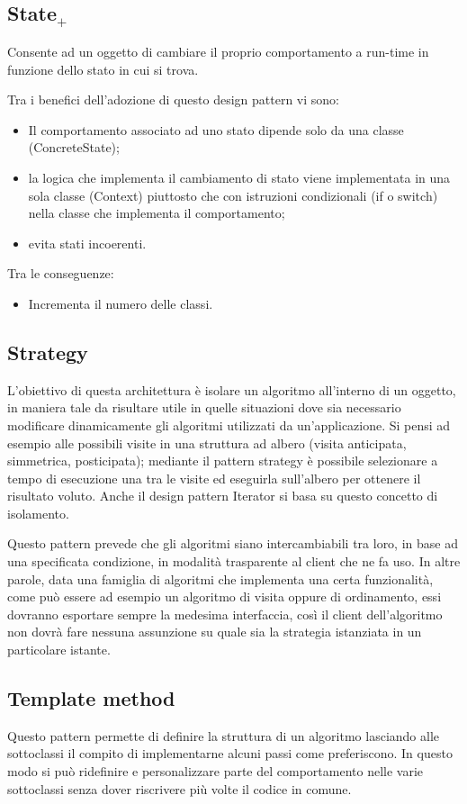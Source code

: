 \subsection{State$_+$}
Consente ad un oggetto di cambiare il proprio comportamento a run-time in funzione dello stato in cui si trova.

Tra i benefici dell'adozione di questo design pattern vi sono:
\begin{itemize}
	\item Il comportamento associato ad uno stato dipende solo da una classe (ConcreteState);
	\item la logica che implementa il cambiamento di stato viene implementata in una sola classe (Context) piuttosto che con istruzioni condizionali (if o switch) nella classe che implementa il comportamento;
	\item evita stati incoerenti.
\end{itemize}
Tra le conseguenze:
\begin{itemize}
\item Incrementa il numero delle classi.
\end{itemize}

\subsection{Strategy}
L'obiettivo di questa architettura è isolare un algoritmo all'interno di un oggetto, in maniera tale da risultare utile in quelle situazioni dove sia necessario modificare dinamicamente gli algoritmi utilizzati da un'applicazione. 
Si pensi ad esempio alle possibili visite in una struttura ad albero (visita anticipata, simmetrica, posticipata); mediante il pattern strategy è possibile selezionare a tempo di esecuzione una tra le visite ed eseguirla sull'albero per ottenere il risultato voluto.
Anche il design pattern Iterator si basa su questo concetto di isolamento.

Questo pattern prevede che gli algoritmi siano intercambiabili tra loro, in base ad una specificata condizione, in modalità trasparente al client che ne fa uso. In altre parole, data una famiglia di algoritmi che implementa una certa funzionalità, come può essere ad esempio un algoritmo di visita oppure di ordinamento, essi dovranno esportare sempre la medesima interfaccia, così il client dell'algoritmo non dovrà fare nessuna assunzione su quale sia la strategia istanziata in un particolare istante.

\subsection{Template method}
Questo pattern permette di definire la struttura di un algoritmo lasciando alle sottoclassi il compito di implementarne alcuni passi come preferiscono. In questo modo si può ridefinire e personalizzare parte del comportamento nelle varie sottoclassi senza dover riscrivere più volte il codice in comune.

